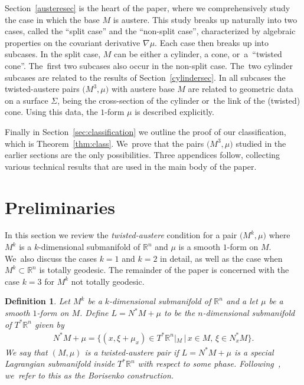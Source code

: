 \documentclass[10pt,a4paper]{amsart}
\def\R{\mathbb{R}}
\newtheorem{Definition}[Theorem]{Definition}
\numberwithin{equation}{section}
\begin{document}
Section~\ref{austeresec} is the heart of the paper, where we comprehensively study the case in which the base $M$ is austere. This study breaks up naturally into two cases, called the ``split case'' and the ``non-split case'', characterized by algebraic properties on the covariant derivative $\nabla \mu$. Each case then breaks up into subcases. In the split case, $M$ can be either a cylinder, a cone, or~a~``twisted cone''. The~first two subcases also occur in the non-split case. The~two cylinder subcases are related to the results of Section~\ref{cylindersec}. In all subcases the twisted-austere pairs $\big(M^3, \mu\big)$ with austere base $M$ are related to geometric data on a surface $\Sigma$, being the cross-section of the cylinder or~the link of the (twisted) cone. Using this data, the $1$-form $\mu$ is described explicitly.

Finally in Section~\ref{sec:classification} we outline the proof of our classification, which is Theorem~\ref{thm:class}. We~prove that the pairs $\big(M^3, \mu\big)$ studied in the earlier sections are the only possibilities. Three appendices follow, collecting various technical results that are used in the main body of the paper.

\section{Preliminaries} \label{sec:preliminaries}

In this section we review the \emph{twisted-austere} condition for a pair $\big(M^k, \mu\big)$ where $M^k$ is a $k$-dimensional submanifold of $\R^n$ and $\mu$ is a smooth $1$-form on $M$. We~also discuss the cases $k=1$ and $k=2$ in detail, as well as the case when $M^k \subset \R^n$ is totally geodesic. The remainder of the paper is concerned with the case $k=3$ for $M^k$ not totally geodesic.

\begin{Definition} %
Let $M^k$ be a $k$-dimensional submanifold of $\R^n$ and a let $\mu$ be a smooth $1$-form on $M$. Define $L = N^* M + \mu$ to be the $n$-dimensional submanifold of $T^* \R^n$ given by
\begin{gather} \label{eq:twisted-austere}
N^* M + \mu = \big\{(x, \xi + \mu_x) \in T^* \R^n|_M \,|\, x \in M,\, \xi \in N^*_x M \big\}.
\end{gather}
We say that $(M,\mu)$ is a \emph{twisted-austere pair} if $L = N^*M+ \mu$ is a special Lagrangian submanifold inside $T^* \R^n$ with respect to some phase. Following~\cite{KL}, we~refer to this as the \emph{Borisenko construction}.
\end{Definition}
\end{document}

